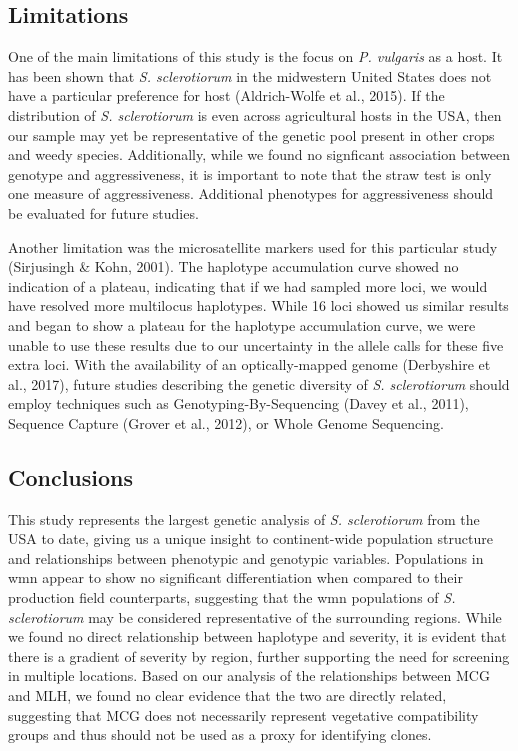 \subsection*{Limitations}\label{limitations}

One of the main limitations of this study is the focus on \emph{P.
vulgaris} as a host. It has been shown that \emph{S. sclerotiorum} in
the midwestern United States does not have a particular preference for
host (Aldrich-Wolfe et al., 2015). If the distribution of \emph{S.
sclerotiorum} is even across agricultural hosts in the USA, then our
sample may yet be representative of the genetic pool present in other
crops and weedy species. Additionally, while we found no signficant
association between genotype and aggressiveness, it is important to note
that the straw test is only one measure of aggressiveness. Additional
phenotypes for aggressiveness should be evaluated for future studies.

Another limitation was the microsatellite markers used for this
particular study (Sirjusingh \& Kohn, 2001). The haplotype accumulation
curve showed no indication of a plateau, indicating that if we had
sampled more loci, we would have resolved more multilocus haplotypes.
While 16 loci showed us similar results and began to show a plateau for
the haplotype accumulation curve, we were unable to use these results
due to our uncertainty in the allele calls for these five extra loci.
With the availability of an optically-mapped genome (Derbyshire et al.,
2017), future studies describing the genetic diversity of \emph{S.
sclerotiorum} should employ techniques such as Genotyping-By-Sequencing
(Davey et al., 2011), Sequence Capture (Grover et al., 2012), or Whole
Genome Sequencing.

\subsection*{Conclusions}\label{conclusions}

This study represents the largest genetic analysis of \emph{S.
sclerotiorum} from the USA to date, giving us a unique insight to
continent-wide population structure and relationships between phenotypic
and genotypic variables. Populations in wmn appear to show no
significant differentiation when compared to their production field
counterparts, suggesting that the wmn populations of \emph{S.
sclerotiorum} may be considered representative of the surrounding
regions. While we found no direct relationship between haplotype and
severity, it is evident that there is a gradient of severity by region,
further supporting the need for screening in multiple locations. Based
on our analysis of the relationships between MCG and MLH, we found no
clear evidence that the two are directly related, suggesting that MCG
does not necessarily represent vegetative compatibility groups and thus
should not be used as a proxy for identifying clones.


